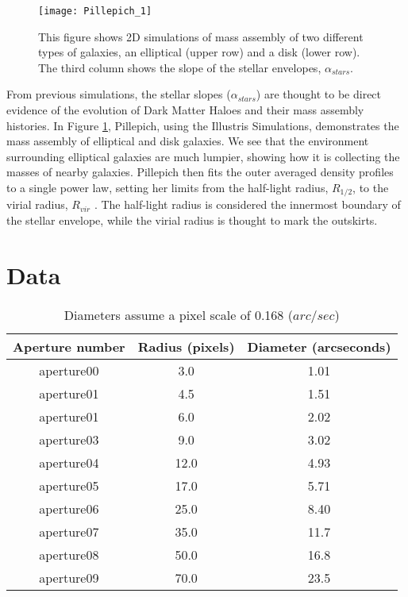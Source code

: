 \documentclass{article}
\begin{document}
\begin{figure}[h!]
\centering
\texttt{[image: Pillepich\_1]}
\caption{This figure shows 2D simulations of mass assembly of two different types of galaxies, an elliptical (upper row) and a disk (lower row). The third column shows the slope of the stellar envelopes, $\alpha_{stars}$. \cite{Pillepich:2014}}
\label{fig:meshaaa}
\end{figure}

From previous simulations, the stellar slopes ($\alpha_{stars}$) are thought to be direct evidence of the evolution of Dark Matter Haloes and their mass assembly histories. In Figure \ref{fig:meshaaa}, Pillepich, using the Illustris Simulations, demonstrates the mass assembly of elliptical and disk galaxies. We see that the environment surrounding elliptical galaxies are much lumpier, showing how it is collecting the masses of nearby galaxies. Pillepich then fits the outer averaged density profiles to a single power law, setting her limits from the half-light radius, $R_{1/2}$, to the virial radius, $R_{vir}$ \cite{Pillepich:2014}. The half-light radius is considered the innermost boundary of the stellar envelope, while the virial radius is thought to mark the outskirts.


\section{Data}
\begin{table}[!htb]
\centering
\begin{tabular}{ccc} \toprule
\textbf{Aperture number} & \textbf{Radius (pixels)} & \textbf{Diameter (arcseconds)} \\ \midrule
aperture00& 3.0 & 1.01\\
aperture01 & 4.5 &1.51  \\
aperture01 &6.0 &2.02\\
aperture03 &9.0 &3.02\\
aperture04 &12.0 &4.93 \\
aperture05 &17.0 &5.71 \\
aperture06 &25.0 &8.40 \\
aperture07 &35.0 &11.7\\
aperture08 &50.0 &16.8\\
aperture09 &70.0 &23.5\\ \bottomrule
\end{tabular}
\caption{Diameters assume a pixel scale of 0.168 ($arc/sec$)}
\label{table:1}
\hfill
\end{table}
\end{document}

